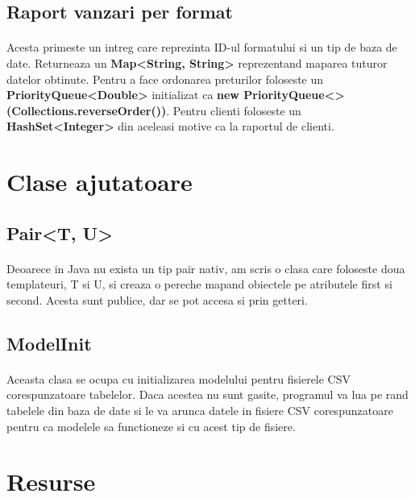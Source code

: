 \documentclass[oneside]{article}
\begin{document}
\subsection[Raport vanzari per format]{Raport vanzari per format}
\paragraph{} Acesta primeste un intreg care reprezinta ID-ul formatului si un tip de baza de date. Returneaza un \textbf{Map<String, String>} reprezentand maparea tuturor datelor obtinute. Pentru a face ordonarea preturilor foloseste un \textbf{PriorityQueue<Double>} initializat ca \textbf{new PriorityQueue<> (Collections.reverseOrder())}. Pentru clienti foloseste un \textbf{HashSet<Integer>} din aceleasi motive ca la raportul de clienti.

\section[Clase ajutatoare]{Clase ajutatoare}
\subsection[Pair<T, U>]{Pair<T, U>}
\paragraph{} Deoarece in Java nu exista un tip pair nativ, am scris o clasa care foloseste doua templateuri, T si U, si creaza o pereche mapand obiectele pe atributele first si second. Acesta sunt publice, dar se pot accesa si prin getteri.

\subsection[ModelInit]{ModelInit}
\paragraph{} Aceasta clasa se ocupa cu initializarea modelului pentru fisierele CSV corespunzatoare tabelelor. Daca acestea nu sunt gasite, programul va lua pe rand tabelele din baza de date si le va arunca datele in fisiere CSV corespunzatoare pentru ca modelele sa functioneze si cu acest tip de fisiere.

\section[Resurse]{Resurse}
\end{document}
